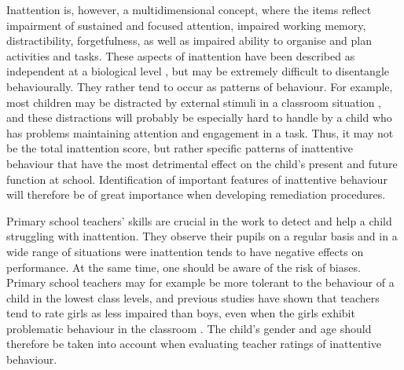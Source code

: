 \documentclass[10pt,letterpaper]{article}
\begin{document}
Inattention is, however, a multidimensional concept,  where the items 
reflect impairment of sustained and focused attention, impaired working memory, distractibility, forgetfulness, as well as impaired ability to organise and plan activities and tasks. These aspects of inattention have been described as independent at a biological level  \cite{Berry2014}, but may be extremely difficult to disentangle behaviourally. They rather tend to occur as patterns of behaviour. For example, most children may be distracted by external stimuli in a classroom situation \cite{Rescorla2007}, and these distractions will probably be especially hard to handle by a child who has problems maintaining attention and engagement in a task. Thus, it may not be the total inattention score, but rather specific patterns of inattentive behaviour that have the most detrimental effect on the child's present and future function at school. Identification of important features of inattentive behaviour will therefore be of great importance when developing remediation procedures. 

Primary school teachers' skills are crucial in the work to detect and help a child struggling with inattention. They observe their pupils on a regular basis and in a wide range of situations were inattention tends to have negative effects on performance. At the same time, one should be aware of the risk of biases. Primary school teachers may for example be more tolerant to the behaviour of a child in the lowest class levels, and previous studies have shown that teachers tend to rate girls as less impaired than boys, even when the girls exhibit problematic behaviour in the classroom \cite{Becker2013, Bussing2003c, Ohan2009}. The child's gender and age should therefore be taken into account when evaluating teacher ratings of inattentive behaviour. \\
\end{document}
